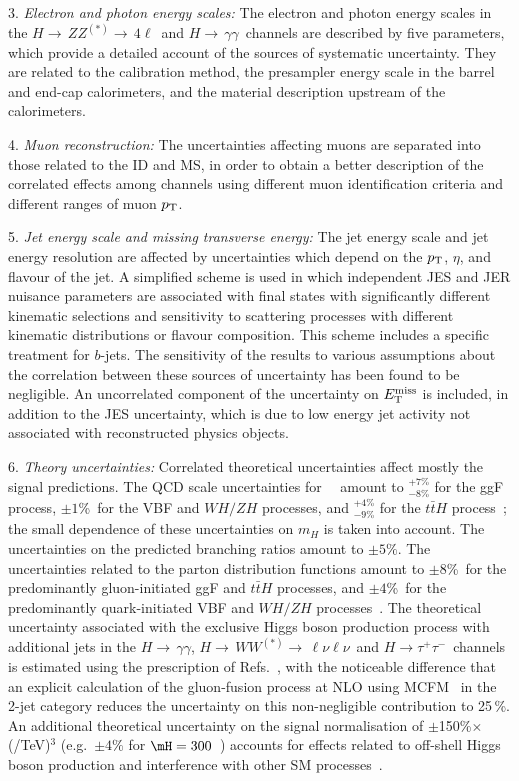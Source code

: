 \documentclass[final,3p,times,twocolumn]{elsarticle}
\newcommand{\hgg}{\ensuremath{H{\rightarrow\,}\gamma\gamma}}
\newcommand{\hWWlnln}{\ensuremath{H{\rightarrow\,}WW^{(*)}{\rightarrow\,}\ell\nu\ell\nu}}
\newcommand{\hZZllll}{\ensuremath{H{\rightarrow\,}ZZ^{(*)}{\rightarrow\,}4\ell}}
\newcommand{\htt}{\ensuremath{H \rightarrow \tau^+\tau^-}}
\begin{document}
3. {\it Electron and photon energy scales:} The electron and photon
energy scales in the \hZZllll\ and  \hgg\ channels are described by
five parameters, which provide a detailed account of the sources of
systematic uncertainty.  They are related to the calibration method,
the presampler energy scale in the barrel and end-cap
calorimeters, and the material description upstream of the calorimeters.

4. {\it Muon reconstruction:} The uncertainties affecting muons are separated into those related
to the ID and MS, in order to
obtain a better description of the correlated effects among channels
using different muon identification criteria and different ranges of
muon $p_{\rm T}$. 

5. {\it Jet energy scale and missing transverse energy:} The jet
energy scale and jet energy resolution are affected by
uncertainties which depend on the $p_{\rm T}$, $\eta$, and flavour of
the jet. 
A simplified scheme is used in which independent JES and JER nuisance
parameters are associated with final states with significantly different
kinematic selections and sensitivity to scattering processes with
different kinematic distributions or flavour composition.  This scheme
includes a specific treatment for $b$-jets. The sensitivity of the
results to various assumptions about the correlation between these
sources of uncertainty has been found to be negligible.
An uncorrelated component of the uncertainty on $E_{\rm T}^{\rm miss}$ is
included, in addition to the JES uncertainty, which is due to low energy jet activity not associated with reconstructed physics objects.

6. {\it Theory uncertainties:} Correlated theoretical uncertainties
affect mostly the signal predictions. The QCD scale uncertainties for
~\GeV\ amount to $^{+7\%}_{-8\%}$ for the ggF process,
$\pm1$\%\ for the VBF and $WH/ZH$ processes, and
$^{+4\%}_{-9\%}$ for the $t\bar{t}H$ process~\cite{LHCHiggsCrossSectionWorkingGroup:2011ti,Dittmaier:2012vm};
the small dependence of these uncertainties on $m_H$ is taken into account.
The uncertainties on the predicted branching ratios amount to $\pm5\%$.
The uncertainties related to
the parton distribution functions amount to $\pm 8$\%\ for the
predominantly gluon-initiated ggF and $t\bar{t}H$ processes, and $\pm 4$\%\
for the predominantly quark-initiated VBF and $WH/ZH$
processes~\cite{Botje:2011sn,Lai:2010vv,Martin:2009iq,Ball:2011mu}.
The theoretical uncertainty associated
with the exclusive Higgs boson production process with additional jets
in the \hgg, \hWWlnln\ and \htt\ channels 
is estimated using the prescription of
Refs.~\cite{LHC-HCG,Stewart:2011cf,Dittmaier:2012vm}, with the
noticeable difference that an explicit calculation of the gluon-fusion
process at NLO using MCFM~\cite{Campbell:2006xx} in the 2-jet
category reduces the uncertainty on this non-negligible contribution to
25\,\%.
An additional theoretical uncertainty on the signal
normalisation of $\pm$150\%$\times$(\mH/TeV)$^3$
(e.g.\ $\pm 4\%$ for $\mH=300$~\GeV)
accounts for effects related to off-shell Higgs boson
production and interference with other SM processes~\cite{Dittmaier:2012vm}.
\end{document}
